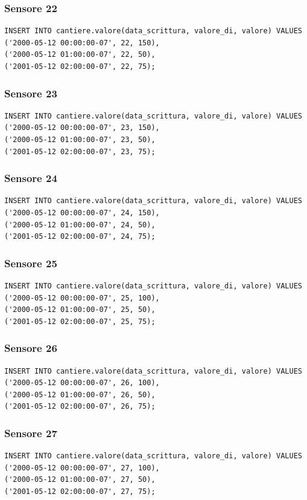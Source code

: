 \documentclass[11pt]{article}
\begin{document}
\subsubsection*{Sensore 22}
\label{sec:orge43d025}
\begin{verbatim}
INSERT INTO cantiere.valore(data_scrittura, valore_di, valore) VALUES
('2000-05-12 00:00:00-07', 22, 150),
('2000-05-12 01:00:00-07', 22, 50),
('2001-05-12 02:00:00-07', 22, 75);
\end{verbatim}
\subsubsection*{Sensore 23}
\label{sec:org1ca2d40}
\begin{verbatim}
INSERT INTO cantiere.valore(data_scrittura, valore_di, valore) VALUES
('2000-05-12 00:00:00-07', 23, 150),
('2000-05-12 01:00:00-07', 23, 50),
('2001-05-12 02:00:00-07', 23, 75);
\end{verbatim}
\subsubsection*{Sensore 24}
\label{sec:org2f79419}
\begin{verbatim}
INSERT INTO cantiere.valore(data_scrittura, valore_di, valore) VALUES
('2000-05-12 00:00:00-07', 24, 150),
('2000-05-12 01:00:00-07', 24, 50),
('2001-05-12 02:00:00-07', 24, 75);
\end{verbatim}
\subsubsection*{Sensore 25}
\label{sec:orgebd5748}
\begin{verbatim}
INSERT INTO cantiere.valore(data_scrittura, valore_di, valore) VALUES
('2000-05-12 00:00:00-07', 25, 100),
('2000-05-12 01:00:00-07', 25, 50),
('2001-05-12 02:00:00-07', 25, 75);
\end{verbatim}
\subsubsection*{Sensore 26}
\label{sec:org6138103}
\begin{verbatim}
INSERT INTO cantiere.valore(data_scrittura, valore_di, valore) VALUES
('2000-05-12 00:00:00-07', 26, 100),
('2000-05-12 01:00:00-07', 26, 50),
('2001-05-12 02:00:00-07', 26, 75);
\end{verbatim}
\subsubsection*{Sensore 27}
\label{sec:org7122576}
\begin{verbatim}
INSERT INTO cantiere.valore(data_scrittura, valore_di, valore) VALUES
('2000-05-12 00:00:00-07', 27, 100),
('2000-05-12 01:00:00-07', 27, 50),
('2001-05-12 02:00:00-07', 27, 75);
\end{verbatim}
\end{document}
